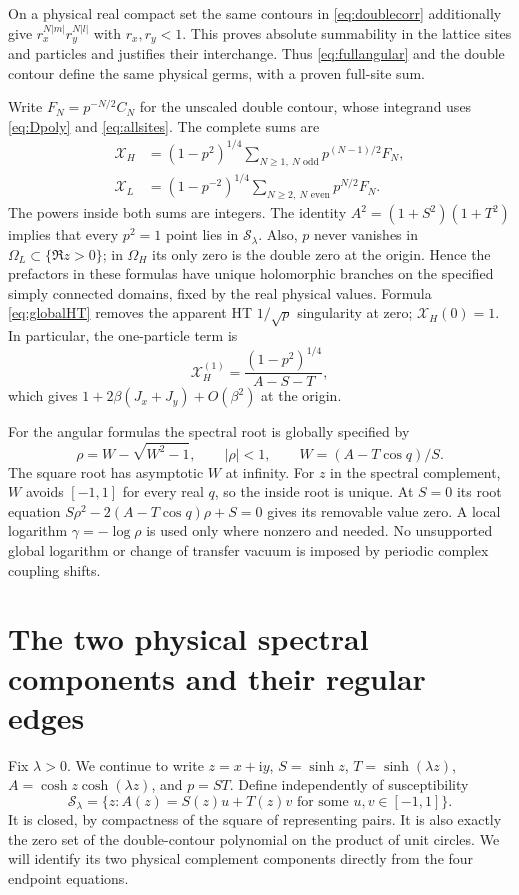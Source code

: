 \documentclass[11pt]{article}
\numberwithin{equation}{section}
\theoremstyle{definition}
\newcommand{\ii}{\mathrm i}
\newcommand{\cS}{\mathcal S}
\newcommand{\OH}{\Omega_H}
\newcommand{\OL}{\Omega_L}
\newcommand{\XH}{\mathcal X_H}
\newcommand{\XL}{\mathcal X_L}
\begin{document}
On a physical real compact set the same contours in
\eqref{eq:doublecorr} additionally give
$r_x^{N|m|}r_y^{N|l|}$ with $r_x,r_y<1$. This proves absolute summability
in the lattice sites and particles and justifies their interchange.
Thus \eqref{eq:fullangular} and the double contour define the same
physical germs, with a proven full-site sum.

Write $F_N=p^{-N/2}C_N$ for the unscaled double contour, whose integrand
uses \eqref{eq:Dpoly} and \eqref{eq:allsites}. The complete sums are
\begin{align}
 \XH&=(1-p^2)^{1/4}\sum_{N\ge1,\ N\text{ odd}}p^{(N-1)/2}F_N,
                                                        \label{eq:globalHT}\\
 \XL&=(1-p^{-2})^{1/4}\sum_{N\ge2,\ N\text{ even}}p^{N/2}F_N.
                                                        \label{eq:globalLT}
\end{align}
The powers inside both sums are integers. The identity
$A^2=(1+S^2)(1+T^2)$ implies that every $p^2=1$ point lies in
$\cS_\lambda$. Also, $p$ never vanishes in $\OL\subset\{\Re z>0\}$;
in $\OH$ its only zero is the double zero at the origin. Hence the
prefactors in these formulas have unique holomorphic branches on the
specified simply connected domains, fixed by the real physical values.
Formula \eqref{eq:globalHT} removes the apparent HT $1/\sqrt p$
singularity at zero; $\XH(0)=1$. In particular, the one-particle term is
\[
 \XH^{(1)}=\frac{(1-p^2)^{1/4}}{A-S-T},
\]
which gives $1+2\beta(J_x+J_y)+O(\beta^2)$ at the origin.

For the angular formulas the spectral root is globally specified by
\[
 \rho=W-\sqrt{W^2-1},\qquad |\rho|<1,
 \qquad W=(A-T\cos q)/S.
\]
The square root has asymptotic $W$ at infinity. For $z$ in the spectral
complement, $W$ avoids $[-1,1]$ for every real $q$, so the inside root
is unique. At $S=0$ its root equation
$S\rho^2-2(A-T\cos q)\rho+S=0$ gives its removable value zero.
A local logarithm $\gamma=-\log\rho$ is used only where nonzero and
needed. No unsupported global logarithm or change of transfer vacuum
is imposed by periodic complex coupling shifts.



\section{The two physical spectral components and their regular edges}
\label{sec:geometry}

Fix $\lambda>0$.  We continue to write
$z=x+\ii y$, $S=\sinh z$, $T=\sinh(\lambda z)$,
$A=\cosh z\cosh(\lambda z)$, and $p=ST$.
Define independently of susceptibility
\begin{equation}\label{eq:spectralset}
 \cS_\lambda=\{z:A(z)=S(z)u+T(z)v
                       \text{ for some }u,v\in[-1,1]\}.
\end{equation}
It is closed, by compactness of the square of representing pairs.
It is also exactly the zero set of the double-contour polynomial
on the product of unit circles.  We will identify its two physical
complement components directly from the four endpoint equations.
\end{document}
